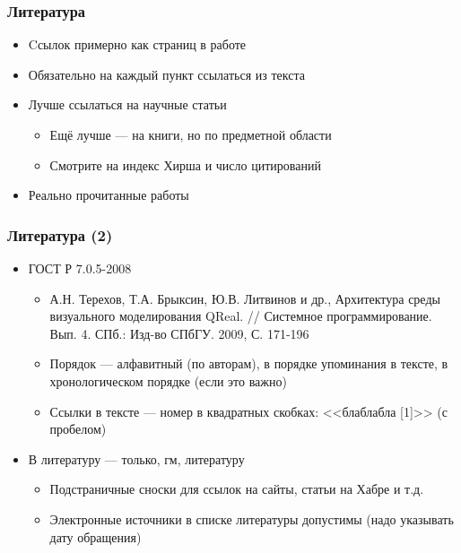 \documentclass[xetex,mathserif,serif]{beamer}
\begin{document}
    \begin{frame}
        \frametitle{Литература}
        \begin{itemize}
            \item Cсылок примерно как страниц в работе
            \item Обязательно на каждый пункт ссылаться из текста
            \item Лучше ссылаться на научные статьи
            \begin{itemize}
                \item Ещё лучше --- на книги, но по предметной области
                \item Смотрите на индекс Хирша и число цитирований
            \end{itemize}
            \item Реально прочитанные работы
        \end{itemize}
    \end{frame}

    \begin{frame}
        \frametitle{Литература (2)}
        \begin{itemize}
            \item ГОСТ Р 7.0.5-2008
            \begin{itemize}
                \item А.Н. Терехов, Т.А. Брыксин, Ю.В. Литвинов и др., Архитектура среды визуального моделирования QReal. // Системное программирование. Вып. 4. СПб.: Изд-во СПбГУ. 2009, С. 171-196
                \item Порядок --- алфавитный (по авторам), в порядке упоминания в тексте, в хронологическом порядке (если это важно)
                \item Ссылки в тексте --- номер в квадратных скобках: <<блаблабла [1]>> (с пробелом)
            \end{itemize}
            \item В литературу --- только, гм, литературу
            \begin{itemize}
                \item Подстраничные сноски для ссылок на сайты, статьи на Хабре и т.д.
                \item Электронные источники в списке литературы допустимы (надо указывать дату обращения)
            \end{itemize}
        \end{itemize}
    \end{frame}
\end{document}
